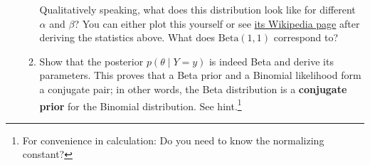 \documentclass[submit]{harvardml}
\begin{document}
\begin{problem}
\begin{enumerate}
\begin{enumerate}
      Qualitatively speaking, what does this distribution look like for different $\alpha$ and $\beta$? You can either plot this yourself or see \href{https://en.wikipedia.org/wiki/Beta_distribution}{its Wikipedia page} after deriving the statistics above. What does $\mathrm{Beta}(1, 1)$ correspond to?

      \item 
      Show that the posterior
      \(p(\theta \mid Y=y)\) is indeed Beta and derive its parameters. This proves that a Beta prior and a Binomial likelihood form a conjugate pair; in other words, the Beta distribution is a \textbf{conjugate prior} for the Binomial distribution. See hint.\footnote{For convenience in calculation: Do you need to know the normalizing constant?}
    \end{enumerate}
  
\end{enumerate}
\end{problem}

\newpage
\end{document}
